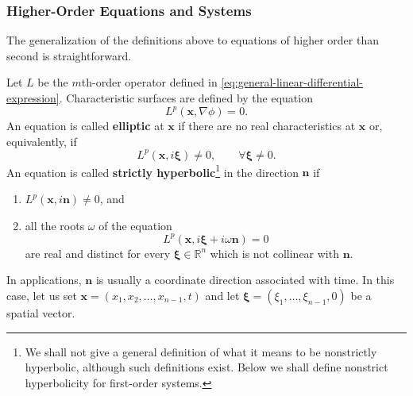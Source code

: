 \subsubsection{Higher-Order Equations and Systems}\label{subsec:higher-order-systems}

The generalization of the definitions above to equations of higher order than second is straightforward.

\begin{Definition}
\label{def:higher-order-pde-type}
Let $L$ be the $m$th-order operator defined in \eqref{eq:general-linear-differential-expression}. Characteristic surfaces are defined by the equation
\begin{equation}\label{eq:higher-order-characteristic-surface}
L^p(\bm{x},\nabla\phi)=0.
\end{equation}
An equation is called \textbf{elliptic} at $\bm{x}$ if there are no real characteristics at $\bm{x}$ or, equivalently, if
\begin{equation}\label{eq:higher-order-ellipticity}
L^p(\bm{x},i\bm{\xi})\ne0,\qquad\forall\bm{\xi}\ne0.
\end{equation}
An equation is called \textbf{strictly hyperbolic}\footnote{We shall not give a general definition of what it means to be nonstrictly hyperbolic, although such definitions exist. Below we shall define nonstrict hyperbolicity for first-order systems.} in the direction $\bm{n}$ if
\begin{enumerate}
\item $L^p(\bm{x},i\bm{n})\ne0$, and
\item all the roots $\omega$ of the equation
\begin{equation}\label{eq:strict-hyperbolic-characteristic-roots}
L^p(\bm{x},i\bm{\xi}+i\omega\bm{n})=0
\end{equation}
are real and distinct for every $\bm{\xi}\in\mathbb{R}^n$ which is not collinear with $\bm{n}$.\end{enumerate}
\end{Definition}

In applications, $\bm{n}$ is usually a coordinate direction associated with time. In this case, let us set $\bm{x}=(x_1,x_2,\ldots,x_{n-1},t)$ and let $\bm{\xi}=(\xi_1,\ldots,\xi_{n-1},0)$ be a spatial vector.

